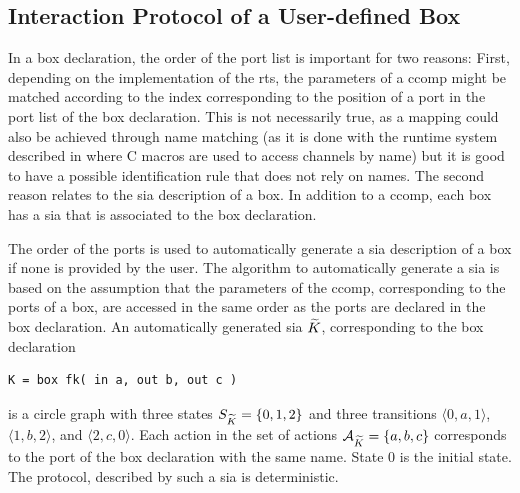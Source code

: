 
\subsection{Interaction Protocol of a User-defined Box}
\label{sect_smx_box_sia}
In a box declaration, the order of the port list is important for two reasons:
First, depending on the implementation of the \gls{rts}, the parameters of a \gls*{ccomp} might be matched according to the index corresponding to the position of a port in the port list of the box declaration.
This is not necessarily true, as a mapping could also be achieved through name matching (as it is done with the runtime system described in \Chap{\ref{chap_tool}} where C macros are used to access channels by name) but it is good to have a possible identification rule that does not rely on names.
The second reason relates to the \gls{sia} description of a box.
In addition to a \gls*{ccomp}, each box has a \gls{sia} that is associated to the box declaration.

The order of the ports is used to automatically generate a \gls{sia} description of a box if none is provided by the user.
The algorithm to automatically generate a \gls{sia} is based on the assumption that the parameters of the \gls*{ccomp}, corresponding to the ports of a box, are accessed in the same order as the ports are declared in the box declaration.
An automatically generated \gls{sia} $\widetilde{K}$, corresponding to the box declaration
\begin{lstlisting}[numbers=none]
K = box fk( in a, out b, out c )
\end{lstlisting}
is a circle graph with three states $S_{\widetilde{K}} = \{ 0, 1, 2 \}$ and three transitions $\langle 0, a, 1 \rangle$, $\langle 1, b, 2 \rangle$, and $\langle 2, c, 0 \rangle$.
Each action in the set of actions $\mathcal{A}_{\widetilde{K}} = \{ a, b, c \}$ corresponds to the port of the box declaration with the same name.
State $0$ is the initial state.
The protocol, described by such a \gls{sia} is deterministic.

